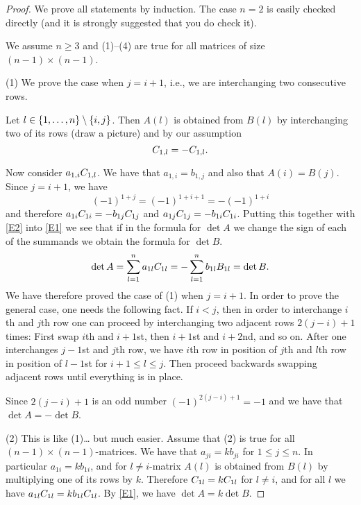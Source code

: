 \begin{proof}
  We prove all statements by induction. The case $n=2$ is easily
  checked directly (and it is strongly suggested that you do check
  it).

  We assume $n\geq 3$ and (1)--(4) are true for all matrices of size
  $(n-1)\times (n-1)$.

  (1) We prove the case when $j=i+1$, i.e., we are interchanging two
  consecutive rows.

  Let $l\in \set{1, \dots, n}\setminus \set{i,j}$.  Then $A(l)$ is
  obtained from $B(l)$ by interchanging two of its rows (draw a
  picture) and by our assumption
  \begin{equation}
    \label{E2}
    \cof{A}{1,l}=-\cof{B}{1,l}.
  \end{equation}

  Now consider $a_{1,i} \cof{A}{1,l}$. We have that $a_{1,i}=b_{1,j}$
  and also that $A(i)=B(j)$. Since $j=i+1$, we have
  \begin{equation*}
    (-1)^{1+j}=(-1)^{1+i+1}=-(-1)^{1+i}
  \end{equation*}
  and therefore $a_{1i}\cof{A}{1i}=-b_{1j} \cof{B}{1j}$ and
  $a_{1j}\cof{A}{1j}=-b_{1i} \cof{B}{1i}$.  Putting this together with
  \eqref{E2} into \eqref{E1} we see that if in the formula for
  $\det A$ we change the sign of each of the summands we obtain the
  formula for $\det B$.
  \begin{equation*}
    \det A=\sum_{l=1}^n a_{1l}\cof{A}{1l}
    =-\sum_{l=1}^n b_{1l} B_{1l}
    =\det B.
  \end{equation*}
  We have therefore proved the case of (1) when $j=i+1$. In order to
  prove the general case, one needs the following fact. If $i<j$, then
  in order to interchange $i$th and $j$th row one can proceed by
  interchanging two adjacent rows $2(j-i)+1$ times: First swap $i$th
  and $i+1$st, then $i+1$st and $i+2$nd, and so on.  After one
  interchanges $j-1$st and $j$th row, we have $i$th row in position of
  $j$th and $l$th row in position of $l-1$st for $i+1\leq l\leq
  j$. Then proceed backwards swapping adjacent rows until everything
  is in place.

  Since $2(j-i)+1$ is an odd number $(-1)^{2(j-i)+1}=-1$ and we have
  that $\det A=-\det B$.

  (2) This is like (1)\dots{} but much easier.  Assume that (2) is
  true for all $(n-1)\times (n-1)$-matrices.  We have that
  $a_{ji}=k b_{ji}$ for $1\leq j\leq n$.  In particular
  $a_{1i}=kb_{1i}$, and for $l\neq i$-matrix $A(l)$ is obtained from
  $B(l)$ by multiplying one of its rows by $k$.  Therefore
  $\cof{A}{1l}=k\cof{B}{1l}$ for $l\neq i$, and for all $l$ we have
  $a_{1l} \cof{A}{1l}=k b_{1l}\cof{B}{1l}$.  By \eqref{E1}, we have
  $\det A=k\det B$.


\end{proof}
